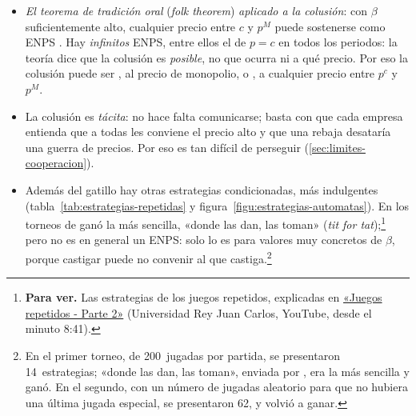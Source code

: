 \documentclass[11pt]{article}
\begin{document}
\begin{itemize}
\item \emph{El teorema de tradición oral} (\emph{folk theorem}) \emph{aplicado a la colusión}: con $\beta$ suficientemente alto, cualquier precio entre $c$ y $p^M$ puede sostenerse como ENPS . Hay \emph{infinitos} ENPS, entre ellos el de $p=c$ en todos los periodos: la teoría dice que la colusión es \emph{posible}, no que ocurra ni a qué precio. Por eso la colusión puede ser , al precio de monopolio, o , a cualquier precio entre $p^c$ y $p^M$.
\item La colusión es \emph{tácita}: no hace falta comunicarse; basta con que cada empresa entienda que a todas les conviene el precio alto y que una rebaja desataría una guerra de precios. Por eso es tan difícil de perseguir (\ref{sec:limites-cooperacion}).
\item Además del gatillo hay otras estrategias condicionadas, más indulgentes (tabla~\ref{tab:estrategias-repetidas} y figura~\ref{figu:estrategias-automatas}). En los torneos de \textcite{Axelrod1984Evolution} ganó la más sencilla, «donde las dan, las toman» (\emph{tit for tat});\footnote{\textbf{Para ver.} Las estrategias de los juegos repetidos, explicadas en \href{https://www.youtube.com/watch?v=U7go4HcB1Tc&t=521s}{«Juegos repetidos - Parte 2»} (Universidad Rey Juan Carlos, YouTube, desde el minuto 8:41).} pero no es en general un ENPS: solo lo es para valores muy concretos de $\beta$, porque castigar puede no convenir al que castiga\nocite{KalaiSametStanford1988Note}.\footnote{En el primer torneo, de 200~jugadas por partida, se presentaron 14~estrategias; «donde las dan, las toman», enviada por , era la más sencilla y ganó. En el segundo, con un número de jugadas aleatorio para que no hubiera una última jugada especial, se presentaron 62, y volvió a ganar\nocite{Axelrod1980Effective,Axelrod1980More}.}
\end{itemize}
\end{document}
